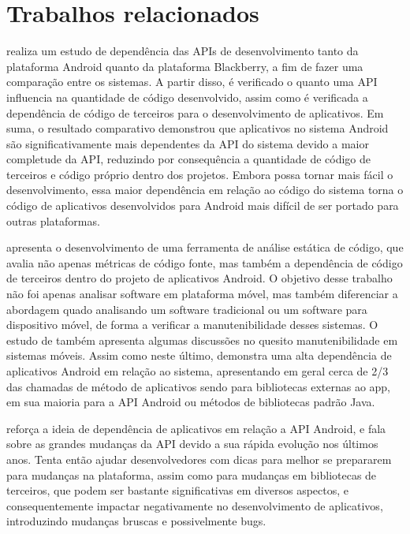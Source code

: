 \section{Trabalhos relacionados}

  realiza um estudo de dependência das APIs de desenvolvimento tanto da plataforma Android quanto da plataforma Blackberry, a fim de fazer uma comparação entre os sistemas. A partir disso, é verificado o quanto uma API influencia na quantidade de código desenvolvido, assim como é verificada a dependência de código de terceiros para o desenvolvimento de aplicativos. Em suma, o resultado comparativo demonstrou que aplicativos no sistema Android são significativamente mais dependentes da API do sistema devido a maior completude da API, reduzindo por consequência a quantidade de código de terceiros e código próprio dentro dos projetos. Embora possa tornar mais fácil o desenvolvimento, essa maior dependência em relação ao código do sistema torna o código de aplicativos desenvolvidos para Android mais difícil de ser portado para outras plataformas.

 apresenta o desenvolvimento de uma ferramenta de análise estática de código, que avalia não apenas métricas de código fonte, mas também a dependência de código de terceiros dentro do projeto de aplicativos Android. O objetivo desse trabalho não foi apenas analisar software em plataforma móvel, mas também diferenciar a abordagem quado analisando um software tradicional ou um software para dispositivo móvel, de forma a verificar a manutenibilidade desses sistemas. O estudo de  também apresenta algumas discussões no quesito manutenibilidade em sistemas móveis. Assim como neste último,  demonstra uma alta dependência de aplicativos Android em relação ao sistema, apresentando em geral cerca de  2/3 das chamadas de método de aplicativos sendo para bibliotecas externas ao app, em sua maioria para a API Android ou métodos de bibliotecas padrão Java.

 reforça a ideia de dependência de aplicativos em relação a API Android, e fala sobre as grandes mudanças da API devido a sua rápida evolução nos últimos anos. Tenta então ajudar desenvolvedores com dicas para melhor se prepararem para mudanças na plataforma, assim como para mudanças em bibliotecas de terceiros, que podem ser bastante significativas em diversos aspectos, e consequentemente impactar negativamente no desenvolvimento de aplicativos, introduzindo mudanças bruscas e possivelmente bugs.

